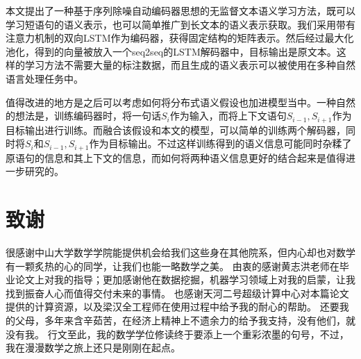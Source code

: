 \documentclass[UTF8,11pt,a4paper,nofonts]{ctexart}
\begin{document}
本文提出了一种基于序列除噪自动编码器思想的无监督文本语义学习方法，既可以学习短语句的语义表示，也可以简单推广到长文本的语义表示获取。我们采用带有注意力机制的双向LSTM作为编码器，获得固定结构的矩阵表示。然后经过最大化池化，得到的向量被放入一个seq2seq的LSTM解码器中，目标输出是原文本。这样的学习方法不需要大量的标注数据，而且生成的语义表示可以被使用在多种自然语言处理任务中。


值得改进的地方是之后可以考虑如何将分布式语义假设也加进模型当中。一种自然的想法是，训练编码器时，将一句话$S_i$作为输入，而将上下文语句$S_{i-1}, S_{i+1}$作为目标输出进行训练。而融合该假设和本文的模型，可以简单的训练两个解码器，同时将$S_i$和$S_{i-1}, S_{i+1}$作为目标输出。不过这样训练得到的语义信息可能同时杂糅了原语句的信息和其上下文的信息，而如何将两种语义信息更好的结合起来是值得进一步研究的。

\section{致谢}

很感谢中山大学数学学院能提供机会给我们这些身在其他院系，但内心却也对数学有一颗炙热的心的同学，让我们也能一略数学之美。
由衷的感谢黄志洪老师在毕业论文上对我的指导；更加感谢他在数据挖掘，机器学习领域上对我的启蒙，让我找到振奋人心而值得交付未来的事情。
也感谢天河二号超级计算中心对本篇论文提供的计算资源，以及梁汉全工程师在使用过程中给予我的耐心的帮助。
还要我的父母，多年来含辛茹苦，在经济上精神上不遗余力的给予我支持，没有他们，就没有我。
行文至此，我的数学学位修读终于要添上一个重彩浓墨的句号，不过，我在漫漫数学之旅上还只是刚刚在起点。


\newpage
{}



\end{document}
